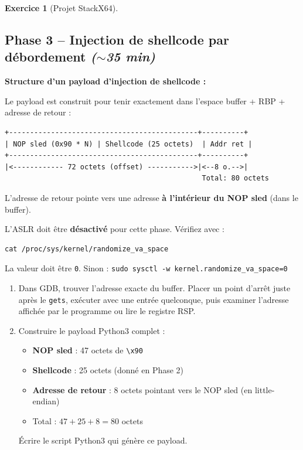 \documentclass[a4paper,11pt]{article}
\theoremstyle{plain}
\theoremstyle{definition}
\newtheorem{exercice}{Exercice}
\begin{document}
\begin{exercice}[Projet StackX64]
\subsection*{Phase 3 -- Injection de shellcode par débordement \hfill\normalfont\textit{($\sim$35 min)}}

\begin{rappel}
\textbf{Structure d'un payload d'injection de shellcode :}

Le payload est construit pour tenir exactement dans l'espace buffer + RBP + adresse de retour :

\begin{lstlisting}[style=GDBStyle]
+---------------------------------------------+----------+
| NOP sled (0x90 * N) | Shellcode (25 octets)  | Addr ret |
+---------------------------------------------+----------+
|<------------ 72 octets (offset) ----------->|<--8 o.-->|
                                               Total: 80 octets
\end{lstlisting}

L'adresse de retour pointe vers une adresse \textbf{à l'intérieur du NOP sled} (dans le buffer).
\end{rappel}

\begin{attention}
L'ASLR doit être \textbf{désactivé} pour cette phase. Vérifiez avec :
\begin{lstlisting}[style=GDBStyle]
cat /proc/sys/kernel/randomize_va_space
\end{lstlisting}
La valeur doit être \texttt{0}. Sinon : \texttt{sudo sysctl -w kernel.randomize\_va\_space=0}
\end{attention}

\begin{enumerate}
\item[\textbf{3a)}] Dans GDB, trouver l'adresse exacte du buffer. Placer un point d'arrêt juste après le \texttt{gets}, exécuter avec une entrée quelconque, puis examiner l'adresse affichée par le programme ou lire le registre RSP.

\item[\textbf{3b)}] Construire le payload Python3 complet :
\begin{itemize}
    \item \textbf{NOP sled} : 47 octets de \texttt{\textbackslash x90}
    \item \textbf{Shellcode} : 25 octets (donné en Phase 2)
    \item \textbf{Adresse de retour} : 8 octets pointant vers le NOP sled (en little-endian)
    \item Total : $47 + 25 + 8 = 80$ octets
\end{itemize}
Écrire le script Python3 qui génère ce payload.


\end{enumerate}
\end{exercice}
\end{document}
